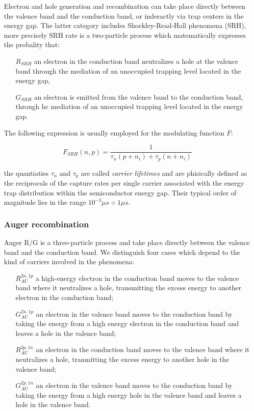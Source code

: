 Electron and hole generation and recombination can take place directly between the valence band and the conduction band, or inderactly via trap centers in the energy gap. The latter category includes Shockley-Read-Hall phenomena (SRH), more precisely SRH rate is a two-particle process which matematically expresses the probality that:
\begin{itemize}
\item[$R_{SRH}$] an electron in the conduction band neutralizes a hole at the valence band through the mediation of an unoccupied trapping level located in the energy gap,
\item[$G_{SRH}$] an electron is emitted from the valence band to the conduction band, through he mediation of an unoccupied trapping level located in the energy gap.
\end{itemize}

The following expression is usually employed for the modulating function $F$:

\begin{equation}
F_{SRH}(n,p) = \dfrac{1}{\tau_n(p+n_i)+\tau_p(n+n_i)}
\end{equation}

the quantiaties $\tau_n$ and $\tau_p$ are called \textit{carrier lifetimes} and are phisically defined as the reciprocals of the capture rates per single carrier associated with the energy trap distribution within the semiconductor energy gap. Their typical order of magnitude lies in the range $10^{-3}\mu s\div 1 \mu s$.


\subsubsection{Auger recombination}

Auger R/G is a three-particle process and take place directly between the valence band and the conduction band. We distinguish four cases which depend to the kind of carriers involved in the phenomena:
\begin{itemize}
\item[$R_{AU}^{2n,1p}$] a high-energy electron in the conduction band moves to the valence band where it neutralizes a hole, transmitting the excess energy to another electron in the conduction band;
\item[$G_{AU}^{2n,1p}$] an electron in the valence band moves to the conduction band by taking the energy from a high energy electron in the conduction band and leaves a hole in the valence band;
\item[$R_{AU}^{2p,1n}$] an electron in the conduction band moves to the valence band where it neutralizes a hole, tranmitting the excess energy to another hole in the valence band;
\item[$G_{AU}^{2p,1n}$] an electron in the valence band moves to the conduction band by taking the energy from a high energy hole in the valence band and leaves a hole in the valence band.
\end{itemize}

